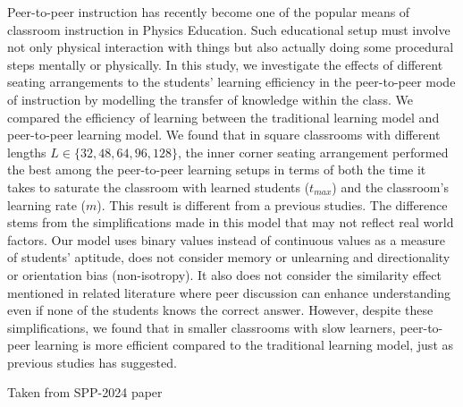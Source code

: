 Peer-to-peer instruction has recently become one of the popular means of classroom instruction in Physics Education. Such educational setup must involve not only physical interaction with things but also actually doing some procedural steps mentally or physically. In this study, we investigate the effects of different seating arrangements to the students' learning efficiency in the peer-to-peer mode of instruction by modelling the transfer of knowledge within the class.  We compared the efficiency of learning between the traditional learning model and peer-to-peer learning model. We found that in square classrooms with different lengths $L \in\lbrace32,48,64,96,128\rbrace$, the inner corner seating arrangement performed the best among the peer-to-peer learning setups in terms of both the time it takes to saturate the classroom with learned students ($t_{max}$) and the classroom’s learning rate ($m$). This result is different from a previous studies. The difference stems from the simplifications made in this model that may not reflect real world factors. Our model uses binary values instead of continuous values as a measure of students’ aptitude, does not consider memory or unlearning and directionality or orientation bias (non-isotropy). It also does not consider the similarity effect mentioned in related literature where peer discussion can enhance understanding even if none of the students knows the correct answer. However, despite these simplifications, we found that in smaller classrooms with slow learners, peer-to-peer learning is more efficient compared to the traditional learning model, just as previous studies has suggested.

Taken from SPP-2024 paper
